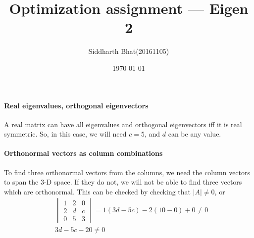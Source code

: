 \documentclass[11pt]{article}
\author{Siddharth Bhat(20161105)}
\title{Optimization assignment --- Eigen 2}
\date{\today}
\begin{document}
\maketitle
\thispagestyle{fancy}

\paragraph{Real eigenvalues, orthogonal eigenvectors}
A real matrix can have all eigenvalues and orthogonal eigenvectors iff 
it is real symmetric. So, in this case, we will need $c = 5$, and $d$
can be any value. 

\paragraph{Orthonormal vectors as column combinations}
To find three orthonormal vectors from the columns, we need the column
vectors to span the 3-D space. If they do not, we will not be able to find
three vectors which are orthonormal. This can be checked by checking that $|A| \neq 0$,
or
\begin{align*}
    &\begin{vmatrix}
        1 & 2 & 0 \\
        2 & d & c \\
        0 & 5 & 3
    \end{vmatrix}
    = 1 (3d - 5c) - 2(10 - 0) + 0 \neq 0 \\
    &3d - 5c - 20 \neq 0
\end{align*}
\end{document}
